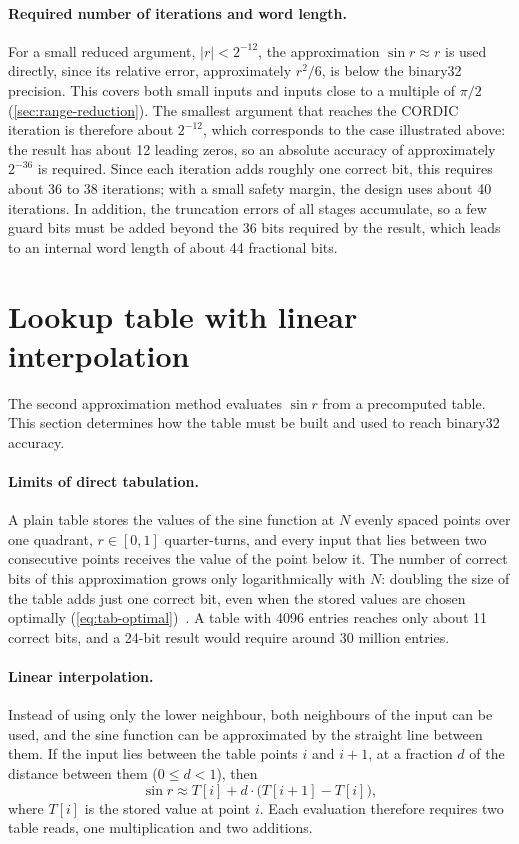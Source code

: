 \paragraph{Required number of iterations and word length.}
\label{pa:small-inputs}
For a small reduced argument, $|r| < 2^{-12}$, the approximation
$\sin r \approx r$ is used directly, since its relative error, approximately
$r^{2}/6$, is below the binary32 precision. This covers both small inputs and
inputs close to a multiple of $\pi/2$ (\cref{sec:range-reduction}). The
smallest argument that reaches the CORDIC iteration is therefore about
$2^{-12}$, which corresponds to the case illustrated above: the result has
about 12 leading zeros, so an absolute accuracy of approximately $2^{-36}$ is
required. Since each iteration adds roughly one correct bit, this requires
about 36 to 38 iterations; with a small safety margin, the design uses about
40 iterations. In addition, the truncation errors of all stages accumulate,
so a few guard bits must be added beyond the 36 bits required by the result,
which leads to an internal word length of about 44 fractional bits.

\section{Lookup table with linear interpolation}
\label{sec:lut}

The second approximation method evaluates $\sin r$ from a precomputed table.
This section determines how the table must be built and used to reach
binary32 accuracy.

\paragraph{Limits of direct tabulation.}
A plain table stores the values of the sine function at $N$ evenly spaced
points over one quadrant, $r \in [0, 1]$ quarter-turns, and every input that
lies between two consecutive points receives the value of the point below it.
The number of correct bits of this approximation grows only logarithmically
with $N$: doubling the size of the table adds just one correct bit, even when
the stored values are chosen optimally (\cref{eq:tab-optimal})~\cite{muller2020}.
A table with 4096 entries reaches only about 11 correct bits, and a 24-bit
result would require around 30 million entries.

\paragraph{Linear interpolation.}
Instead of using only the lower neighbour, both neighbours of the input can be
used, and the sine function can be approximated by the straight line between
them. If the input lies between the table points $i$ and $i+1$, at a fraction
$d$ of the distance between them ($0 \le d < 1$), then
\begin{equation}
  \sin r \approx T[i] + d \cdot \big( T[i+1] - T[i] \big),
  \label{eq:lerp}
\end{equation}
where $T[i]$ is the stored value at point $i$. Each evaluation therefore
requires two table reads, one multiplication and two additions.

